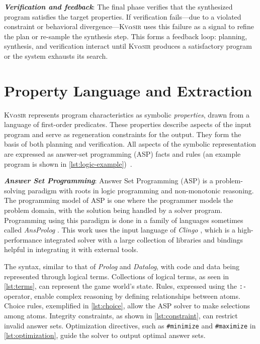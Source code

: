 \documentclass[nonacm,sigplan,review]{acmart}
\newcommand{\sys}{{\scshape Kv{$\alpha$}sir}\xspace}
\newcommand{\heading}[1]{\vspace{2pt}\noindent\textbf{\emph{#1}}:\enspace}
\begin{document}
\heading{Verification and feedback}
The final phase verifies that the
synthesized program satisfies the target properties.
If verification fails---due to a violated constraint or behavioral divergence---\sys uses this
failure as a signal to refine the plan or re-sample the synthesis step.
This forms a feedback loop: planning, synthesis, and verification interact until \sys
produces a satisfactory program or the system exhausts its search.

\section{Property Language and Extraction}
\label{sec:dsl}

\sys represents program characteristics as symbolic \emph{properties}, drawn from a language of first-order predicates.
These properties describe aspects of the input program and serve as regeneration constraints for the output.
They form the basis of both planning and verification.
All aspects of the symbolic representation are expressed as answer-set programming (ASP) facts and rules (an example program is shown in \cref{lst:logic-example})~\cite{Eiter_2009}.

\heading{Answer Set Programming}
Answer Set Programming (ASP) \cite{Gelfond_2000, Eiter_2009} is a problem-solving paradigm with roots in logic programming and non-monotonic reasoning.
The programming 
model of ASP is one where the programmer models
the problem domain, with the solution being handled by a solver program.
Programming using this paradigm is done in a family of languages sometimes called \textit{AnsProlog} \cite{Gelfond_2002}.
This work uses the input language of \textit{Clingo} \cite{DBLP:journals/corr/GebserKKS14}, which 
is a high-performance integrated solver with a large collection of libraries and bindings helpful in integrating it with external tools.

The syntax, similar to that of \textit{Prolog} and \textit{Datalog}, with code and data being represented
through logical terms. Collections of logical terms, as seen in
\cref{lst:terms}, can represent the game world's state. Rules, expressed using
the \texttt{:-} operator, enable complex reasoning by defining relationships
between atoms. Choice rules, exemplified in \cref{lst:choice}, allow the ASP
solver to make selections among atoms. Integrity constraints, as shown in
\cref{lst:constraint}, can restrict invalid answer sets. Optimization
directives, such as \texttt{\#minimize} and \texttt{\#maximize} in
\cref{lst:optimization}, guide the solver to output optimal answer sets.
\end{document}
